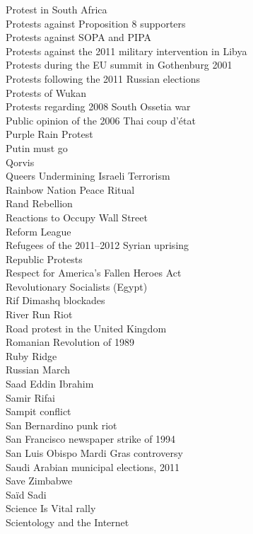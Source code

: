 Protest in South Africa\\
Protests against Proposition 8 supporters\\
Protests against SOPA and PIPA\\
Protests against the 2011 military intervention in Libya\\
Protests during the EU summit in Gothenburg 2001\\
Protests following the 2011 Russian elections\\
Protests of Wukan\\
Protests regarding 2008 South Ossetia war\\
Public opinion of the 2006 Thai coup d'état\\
Purple Rain Protest\\
Putin must go\\
Qorvis\\
Queers Undermining Israeli Terrorism\\
Rainbow Nation Peace Ritual\\
Rand Rebellion\\
Reactions to Occupy Wall Street\\
Reform League\\
Refugees of the 2011–2012 Syrian uprising\\
Republic Protests\\
Respect for America's Fallen Heroes Act\\
Revolutionary Socialists (Egypt)\\
Rif Dimashq blockades\\
River Run Riot\\
Road protest in the United Kingdom\\
Romanian Revolution of 1989\\
Ruby Ridge\\
Russian March\\
Saad Eddin Ibrahim\\
Samir Rifai\\
Sampit conflict\\
San Bernardino punk riot\\
San Francisco newspaper strike of 1994\\
San Luis Obispo Mardi Gras controversy\\
Saudi Arabian municipal elections, 2011\\
Save Zimbabwe\\
Saïd Sadi\\
Science Is Vital rally\\
Scientology and the Internet\\
